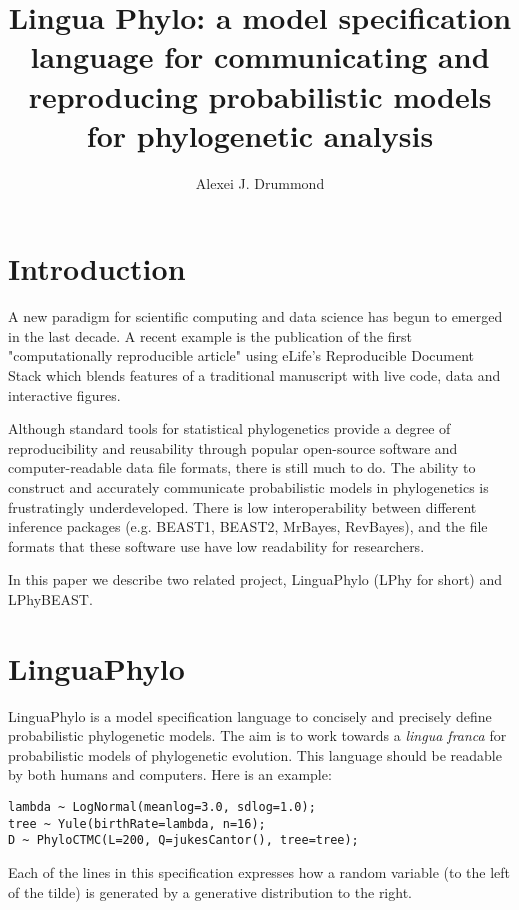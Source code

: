 \documentclass[11pt]{article}
\begin{document}
\title{Lingua Phylo: a model specification language for communicating and reproducing probabilistic models for phylogenetic analysis}
\author{Alexei J. Drummond}
\date{}
\maketitle


\section{Introduction}

A new paradigm for scientific computing and data science has begun to emerged in the last decade. A recent example is the publication of the first "computationally reproducible article" using eLife's Reproducible Document Stack which blends features of a traditional manuscript with live code, data and interactive figures.

Although standard tools for statistical phylogenetics provide a degree of reproducibility and reusability through popular open-source software and computer-readable data file formats, there is still much to do. The ability to construct and accurately communicate probabilistic models in phylogenetics is frustratingly underdeveloped. There is low interoperability between different inference packages (e.g. BEAST1, BEAST2, MrBayes, RevBayes), and the file formats that these software use have low readability for researchers.

In this paper we describe two related project, LinguaPhylo (LPhy for short) and LPhyBEAST. 



\section{ LinguaPhylo}

LinguaPhylo is a model specification language to concisely and precisely define probabilistic phylogenetic models. The aim is to work towards a {\it lingua franca} for probabilistic models of phylogenetic evolution. This language should be readable by both humans and computers. Here is an example:

\begin{verbatim}
lambda ~ LogNormal(meanlog=3.0, sdlog=1.0);
tree ~ Yule(birthRate=lambda, n=16);
D ~ PhyloCTMC(L=200, Q=jukesCantor(), tree=tree);
\end{verbatim}

Each of the lines in this specification expresses how a random variable (to the left of the tilde) is generated by a generative distribution to the right.
\end{document}
